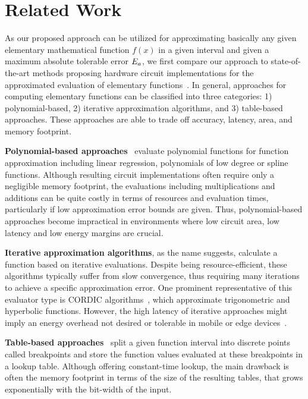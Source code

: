 \section{Related Work}
\label{sec:relwork}
{
As our proposed approach can be utilized for approximating basically any given elementary mathematical function $f(x)$ in a given interval and given a maximum absolute tolerable error $E_a$, we first compare our approach to state-of-the-art methods proposing hardware circuit implementations for the approximated evaluation of elementary functions~\cite{Adcock2017,Shuman:2011,Lee2009,Butler2011,Caro2011,Dong2014,cordic:1998,cordic:2017,approxLUT,MATLAB:reference}. 
In general, approaches for computing elementary functions can be classified into three categories: 1) polynomial-based, 2) iterative approximation algorithms, and 3) table-based approaches. 
These approaches are able to trade off accuracy, latency, area, and memory footprint.\par
}
{\textbf{Polynomial-based approaches}~\cite{Adcock2017,Shuman:2011,Lee2009,Butler2011,Caro2011,Dong2014} evaluate polynomial functions for function approximation including linear regression, polynomials of low degree or spline functions.
Although resulting circuit implementations often require only a negligible memory footprint, the evaluations including multiplications and additions can be quite costly in terms of resources and evaluation times, particularly if low approximation error bounds are given.}
{Thus, polynomial-based approaches become impractical in environments where low circuit area, low latency and low energy margins are crucial.}\par
{\textbf{Iterative approximation algorithms}}, as the name suggests, calculate a function based on iterative evaluations. 
Despite being resource-efficient, these algorithms typically suffer from slow convergence, thus requiring many iterations to achieve a specific approximation error. 
One prominent representative of this evaluator type is CORDIC algorithms~\cite{cordic:1998,cordic:2017}, which approximate trigonometric and hyperbolic functions. 
{However, the high latency of iterative approaches might imply an energy overhead not desired or tolerable in mobile or edge devices~\cite{Kong:2022,Ota:2017}.}\par
{\textbf{Table-based approaches}}~\cite{approxLUT,MATLAB:reference} split a given function interval into discrete points called breakpoints and store the function values evaluated at these breakpoints in a lookup table.
Although offering constant-time lookup, the main drawback is often the {memory footprint in terms of the size} of the resulting tables, that grows exponentially with the bit-width of the input.
